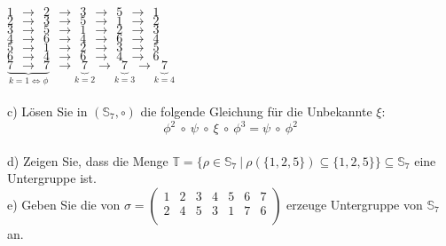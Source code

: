 $1 \ \ \rightarrow \ \ 2 \ \ \rightarrow \ \ 3 \ \ \rightarrow \ \ 5 \ \ \rightarrow \ \ 1$\\
$2 \ \ \rightarrow \ \ 3 \ \ \rightarrow \ \ 5 \ \ \rightarrow \ \ 1 \ \ \rightarrow \ \ 2$\\
$3 \ \ \rightarrow \ \ 5 \ \ \rightarrow \ \ 1 \ \ \rightarrow \ \ 2 \ \ \rightarrow \ \ 3$\\
$4 \ \ \rightarrow \ \ 6 \ \ \rightarrow \ \ 4 \ \ \rightarrow \ \ 6 \ \ \rightarrow \ \ 4$\\
$5 \ \ \rightarrow \ \ 1 \ \ \rightarrow \ \ 2 \ \ \rightarrow \ \ 3 \ \ \rightarrow \ \ 5$\\
$6 \ \ \rightarrow \ \ 4 \ \ \rightarrow \ \ 6 \ \ \rightarrow \ \ 4 \ \ \rightarrow \ \ 6$\\
$\underbrace{7 \ \ \rightarrow \ \ 7}_{k = 1 \Leftrightarrow \phi} \ \ \rightarrow \underbrace{7}_{k = 2} \rightarrow \underbrace{7}_{k = 3} \rightarrow \underbrace{7}_{k = 4}$\\~\\

c) Lösen Sie in $(\mathbb{S}_7, \circ)$ die folgende Gleichung für die Unbekannte $\xi:$
$$
\phi^2 \ \circ \ \psi \ \circ \ \xi \ \circ \ \phi^3 = \psi \ \circ \ \phi^2
$$\\

d) Zeigen Sie, dass die Menge $\mathbb{T} = \{\rho \in \mathbb{S}_7 \ | \ \rho(\{1, 2, 5\}) \subseteq \{1, 2, 5\}\} \subseteq \mathbb{S}_7$ eine Untergruppe ist.\\

e) Geben Sie die von $\sigma = \begin{pmatrix}1 & 2 & 3 & 4 & 5 & 6 & 7\\2 & 4 & 5 & 3 & 1 & 7 & 6\\\end{pmatrix}$ erzeuge Untergruppe von $\mathbb{S}_7$ an.



